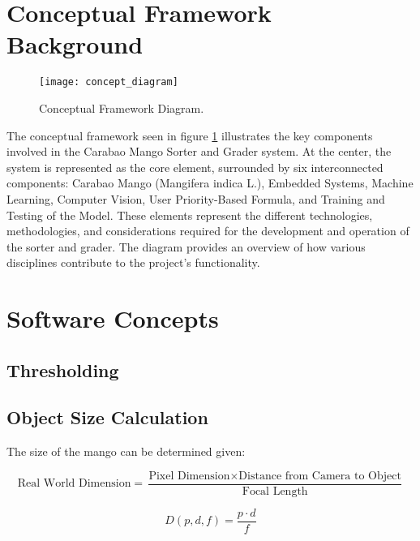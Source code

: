 \section{Conceptual Framework Background}

\begin{figure}[!htbp]
	\centering
	\texttt{[image: concept\_diagram]}
	\caption{Conceptual Framework Diagram.}
	\label{fig:theoreticalDiagram2}
\end{figure}
 
The conceptual framework seen in figure \ref{fig:theoreticalDiagram2}
illustrates the key components involved in the Carabao Mango Sorter and Grader
system. At the center, the system is represented as the core element, surrounded
by six interconnected components: Carabao Mango (Mangifera indica L.), Embedded
Systems, Machine Learning, Computer Vision, User Priority-Based Formula, and
Training and Testing of the Model. These elements represent the different
technologies, methodologies, and considerations required for the development and
operation of the sorter and grader. The diagram provides an overview of how
various disciplines contribute to the project’s functionality.

\section{Software Concepts}

\subsection{Thresholding}

\subsection{Object Size Calculation}
The size of the mango can be determined given:

\begin{equation}
	\label{eq:objectSizeCalculation}
	\text{Real World Dimension} = \frac{\text{Pixel Dimension} \times \text{Distance from Camera to Object}}{\text{Focal Length}}
\end{equation}

\begin{equation} \label{eq:objectSizeCalculation2}
	\ensuremath{D \left( p, d, f \right)= \frac{p \cdot d}{f} }
\end{equation}

